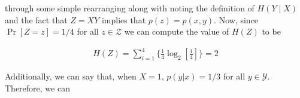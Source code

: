 \documentclass[ClusteringConnectionsMAIN.tex]{subfiles}
\begin{document}
through some simple rearranging along with noting the definition of $H \left( Y \mid X \right)$ and the fact that $Z = X Y$ implies that $p \left( z \right) = p \left( x, y \right)$.  Now, since $\Pr \left[ Z = z \right] = 1 / 4$ for all $z \in \mathcal{Z}$ we can compute the value of $H \left( Z \right)$ to be

\begin{align} \label{c2p24eq2}
H \left( Z \right) = \sum_{i=1}^4 \biggl\{ \frac{1}{4} \log_2 \left[ \frac{1}{4} \right] \biggr\} = 2  \tag{2.24-2}
\end{align}

Additionally, we can say that, when $X = 1$, $p \left( y | x \right) = 1/3$ for all $y \in \mathcal{Y}$.  Therefore, we can 
\end{document}
